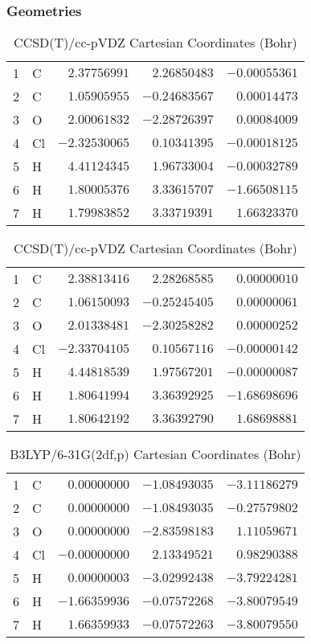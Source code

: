 \documentclass[10pt,oneside]{article}
\begin{document}
\begin{table}[h!]
\subsubsection*{Geometries}
\begin{multicols}{2}
\centering
\caption{CCSD(T)/cc-pVTZ Cartesian Coordinates (Bohr)}
\begin{tabular}{llrrr}
\toprule
1  & C  & $ 2.37756991$ & $ 2.26850483$ & $-0.00055361$ \\
2  & C  & $ 1.05905955$ & $-0.24683567$ & $ 0.00014473$ \\
3  & O  & $ 2.00061832$ & $-2.28726397$ & $ 0.00084009$ \\
4  & Cl & $-2.32530065$ & $ 0.10341395$ & $-0.00018125$ \\
5  & H  & $ 4.41124345$ & $ 1.96733004$ & $-0.00032789$ \\
6  & H  & $ 1.80005376$ & $ 3.33615707$ & $-1.66508115$ \\
7  & H  & $ 1.79983852$ & $ 3.33719391$ & $ 1.66323370$ \\
\bottomrule
\end{tabular}
\caption{CCSD(T)/cc-pVDZ Cartesian Coordinates (Bohr)}
\begin{tabular}{llrrr}
\toprule
1  & C  & $ 2.38813416$ & $ 2.28268585$ & $ 0.00000010$ \\
2  & C  & $ 1.06150093$ & $-0.25245405$ & $ 0.00000061$ \\
3  & O  & $ 2.01338481$ & $-2.30258282$ & $ 0.00000252$ \\
4  & Cl & $-2.33704105$ & $ 0.10567116$ & $-0.00000142$ \\
5  & H  & $ 4.44818539$ & $ 1.97567201$ & $-0.00000087$ \\
6  & H  & $ 1.80641994$ & $ 3.36392925$ & $-1.68698696$ \\
7  & H  & $ 1.80642192$ & $ 3.36392790$ & $ 1.68698881$ \\
\bottomrule
\end{tabular}
\end{multicols}
\end{table}

\begin{table}[h]
\centering
\caption{B3LYP/6-31G(2df,p) Cartesian Coordinates (Bohr)}
\begin{tabular}{llrrr}
\toprule
1  & C  & $ 0.00000000$ & $-1.08493035$ & $-3.11186279$ \\
2  & C  & $ 0.00000000$ & $-1.08493035$ & $-0.27579802$ \\
3  & O  & $ 0.00000000$ & $-2.83598183$ & $ 1.11059671$ \\
4  & Cl & $-0.00000000$ & $ 2.13349521$ & $ 0.98290388$ \\
5  & H  & $ 0.00000003$ & $-3.02992438$ & $-3.79224281$ \\
6  & H  & $-1.66359936$ & $-0.07572268$ & $-3.80079549$ \\
7  & H  & $ 1.66359933$ & $-0.07572263$ & $-3.80079550$ \\
\bottomrule
\end{tabular}
\end{table}
\end{document}
